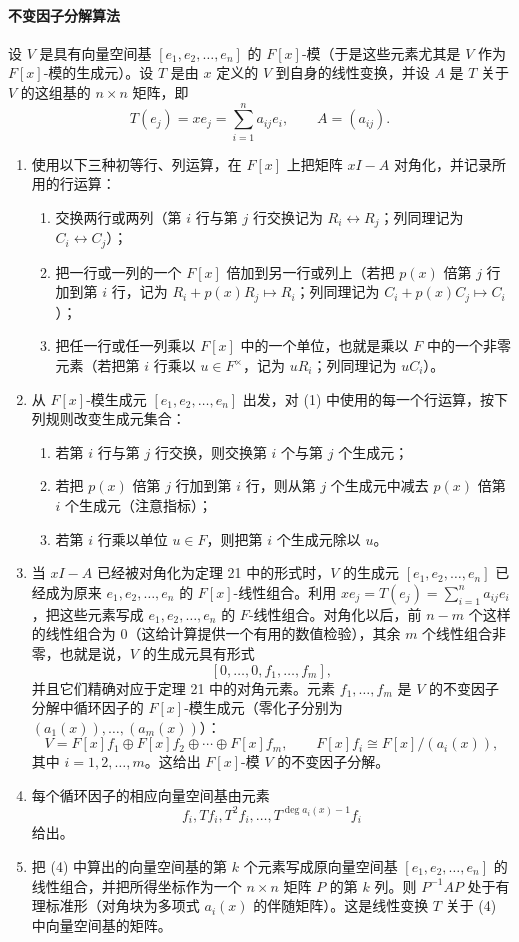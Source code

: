 \paragraph{不变因子分解算法}
设 $V$ 是具有向量空间基 $[e_1,e_2,\ldots,e_n]$ 的 $F[x]$-模（于是这些元素尤其是 $V$ 作为 $F[x]$-模的生成元）。设 $T$ 是由 $x$ 定义的 $V$ 到自身的线性变换，并设 $A$ 是 $T$ 关于 $V$ 的这组基的 $n\times n$ 矩阵，即
\[
T(e_j)=xe_j=\sum_{i=1}^n a_{ij}e_i,
\qquad A=(a_{ij}).
\]
\begin{enumerate}[label=(\arabic*)]
\item 使用以下三种初等行、列运算，在 $F[x]$ 上把矩阵 $xI-A$ 对角化，并记录所用的行运算：
\begin{enumerate}[label=(\alph*)]
\item 交换两行或两列（第 $i$ 行与第 $j$ 行交换记为 $R_i\leftrightarrow R_j$；列同理记为 $C_i\leftrightarrow C_j$）；
\item 把一行或一列的一个 $F[x]$ 倍加到另一行或列上（若把 $p(x)$ 倍第 $j$ 行加到第 $i$ 行，记为 $R_i+p(x)R_j\mapsto R_i$；列同理记为 $C_i+p(x)C_j\mapsto C_i$）；
\item 把任一行或任一列乘以 $F[x]$ 中的一个单位，也就是乘以 $F$ 中的一个非零元素（若把第 $i$ 行乘以 $u\in F^\times$，记为 $uR_i$；列同理记为 $uC_i$）。
\end{enumerate}
\item 从 $F[x]$-模生成元 $[e_1,e_2,\ldots,e_n]$ 出发，对 (1) 中使用的每一个行运算，按下列规则改变生成元集合：
\begin{enumerate}[label=(\alph*)]
\item 若第 $i$ 行与第 $j$ 行交换，则交换第 $i$ 个与第 $j$ 个生成元；
\item 若把 $p(x)$ 倍第 $j$ 行加到第 $i$ 行，则从第 $j$ 个生成元中减去 $p(x)$ 倍第 $i$ 个生成元（注意指标）；
\item 若第 $i$ 行乘以单位 $u\in F$，则把第 $i$ 个生成元除以 $u$。
\end{enumerate}
\item 当 $xI-A$ 已经被对角化为定理 21 中的形式时，$V$ 的生成元 $[e_1,e_2,\ldots,e_n]$ 已经成为原来 $e_1,e_2,\ldots,e_n$ 的 $F[x]$-线性组合。利用 $xe_j=T(e_j)=\sum_{i=1}^n a_{ij}e_i$，把这些元素写成 $e_1,e_2,\ldots,e_n$ 的 $F$-线性组合。对角化以后，前 $n-m$ 个这样的线性组合为 $0$（这给计算提供一个有用的数值检验），其余 $m$ 个线性组合非零，也就是说，$V$ 的生成元具有形式
\[
[0,\ldots,0,f_1,\ldots,f_m],
\]
并且它们精确对应于定理 21 中的对角元素。元素 $f_1,\ldots,f_m$ 是 $V$ 的不变因子分解中循环因子的 $F[x]$-模生成元（零化子分别为 $(a_1(x)),\ldots,(a_m(x))$）：
\[
V=F[x]f_1\oplus F[x]f_2\oplus\cdots\oplus F[x]f_m,
\qquad
F[x]f_i\cong F[x]/(a_i(x)),
\]
其中 $i=1,2,\ldots,m$。这给出 $F[x]$-模 $V$ 的不变因子分解。
\item 每个循环因子的相应向量空间基由元素
\[
f_i,Tf_i,T^2f_i,\ldots,T^{\deg a_i(x)-1}f_i
\]
给出。
\item 把 (4) 中算出的向量空间基的第 $k$ 个元素写成原向量空间基 $[e_1,e_2,\ldots,e_n]$ 的线性组合，并把所得坐标作为一个 $n\times n$ 矩阵 $P$ 的第 $k$ 列。则 $P^{-1}AP$ 处于有理标准形（对角块为多项式 $a_i(x)$ 的伴随矩阵）。这是线性变换 $T$ 关于 (4) 中向量空间基的矩阵。
\end{enumerate}

